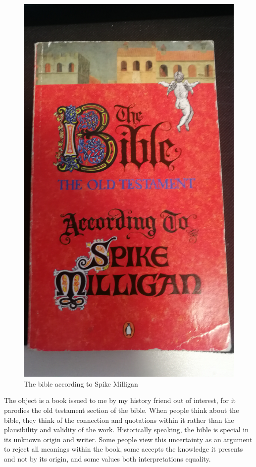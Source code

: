 \documentclass[a4paper,12pt]{article}
\begin{document}
\begin{figure}[h!]
 \centering
 \includegraphics[scale=0.1]{bible.jpg}
 \caption{The bible according to Spike Milligan}
 \label{fig:bible}
\end{figure}

The object is a book issued to me by my history friend out of interest, for it parodies the old testament section of the bible. When people think about the bible, they think of the connection and quotations within it rather than the plausibility and validity of the work. Historically speaking, the bible is special in its unknown origin and writer. Some people view this uncertainty as an argument to reject all meanings within the book, some accepts the knowledge it presents and not by its origin, and some values both interpretations equality.
\end{document}
